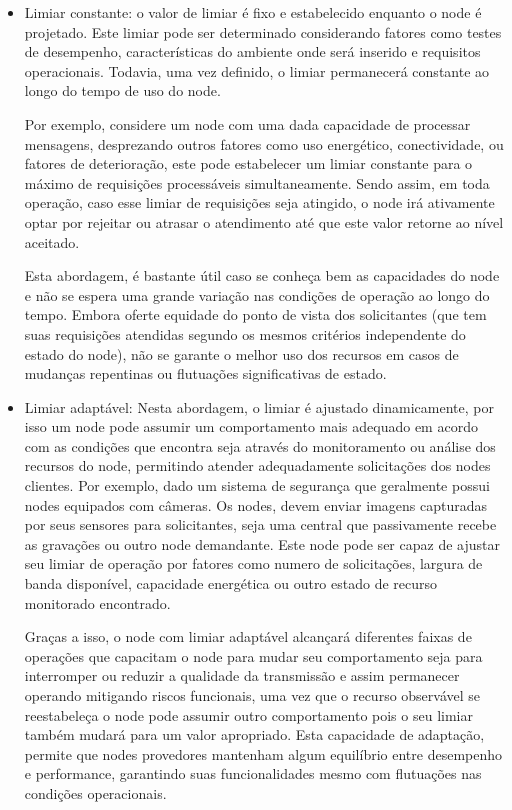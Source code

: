 \begin{itemize}

    \item Limiar constante: o valor de limiar é fixo e estabelecido enquanto o node é projetado. Este limiar pode ser determinado considerando fatores como testes de desempenho, características do ambiente onde será inserido e requisitos operacionais. Todavia, uma vez definido, o limiar permanecerá constante ao longo do tempo de uso do node. 
    
    Por exemplo, considere um node com uma dada capacidade de processar mensagens, desprezando outros fatores como uso energético, conectividade, ou fatores de deterioração, este pode estabelecer um limiar constante para o máximo de requisições processáveis simultaneamente. Sendo assim, em toda operação, caso esse limiar de requisições seja atingido, o node irá ativamente optar por rejeitar ou atrasar o atendimento até que este valor retorne ao nível aceitado. 
    
    Esta abordagem, é bastante útil caso se conheça bem as capacidades do node e não se espera uma grande variação nas condições de operação ao longo do tempo. Embora oferte equidade do ponto de vista dos solicitantes (que tem suas requisições atendidas segundo os mesmos critérios independente do estado do node), não se garante o melhor uso dos recursos em casos de mudanças repentinas ou flutuações significativas de estado.
    
    \item Limiar adaptável: Nesta abordagem, o limiar é ajustado dinamicamente, por isso um node pode assumir um comportamento mais adequado em acordo com as condições que encontra seja através do monitoramento ou análise dos recursos do node, permitindo atender adequadamente solicitações dos nodes clientes. Por exemplo, dado um sistema de segurança que geralmente possui nodes equipados com câmeras. Os nodes, devem enviar imagens capturadas por seus sensores para solicitantes, seja uma central que passivamente recebe as gravações ou outro node demandante. Este node pode ser capaz de ajustar seu limiar de operação por fatores como numero de solicitações, largura de banda disponível, capacidade energética ou outro estado de recurso monitorado encontrado. 
    
    Graças a isso, o node com limiar adaptável alcançará diferentes faixas de operações que capacitam o node para mudar seu comportamento seja para interromper ou reduzir a qualidade da transmissão e assim permanecer operando mitigando riscos funcionais, uma vez que o recurso observável se reestabeleça o node pode assumir outro comportamento pois o seu limiar também mudará para um valor apropriado. Esta capacidade de adaptação, permite que nodes provedores mantenham algum equilíbrio entre desempenho e performance, garantindo suas funcionalidades mesmo com flutuações nas condições operacionais.
    
\end{itemize}

